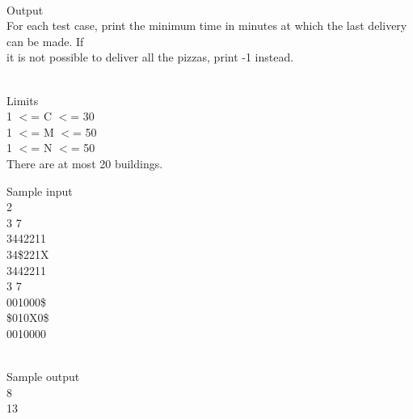 \\   Output   
\\   For each test case, print the minimum time in minutes at which the last delivery can be made. If   
\\   it is not possible to deliver all the pizzas, print -1 instead.  


\\   Limits   
\\   1 $<$= C $<$= 30   
\\   1 $<$= M $<$= 50   
\\   1 $<$= N $<$= 50   
\\   There are at most 20 buildings.  

   Sample input   
\\   2   
\\   3 7   
\\   3442211   
\\   34\$221X   
\\   3442211   
\\   3 7   
\\   001000\$   
\\   \$010X0\$   
\\   0010000  


\\   Sample output   
\\   8   
\\   13  